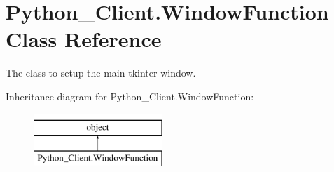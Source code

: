 \hypertarget{class_python___client_1_1_window_function}{}\section{Python\+\_\+\+Client.\+Window\+Function Class Reference}
\label{class_python___client_1_1_window_function}


The class to setup the main tkinter window.  


Inheritance diagram for Python\+\_\+\+Client.\+Window\+Function\+:\begin{figure}[H]
\begin{center}
\leavevmode
\includegraphics[height=2.000000cm]{class_python___client_1_1_window_function}
\end{center}
\end{figure}
